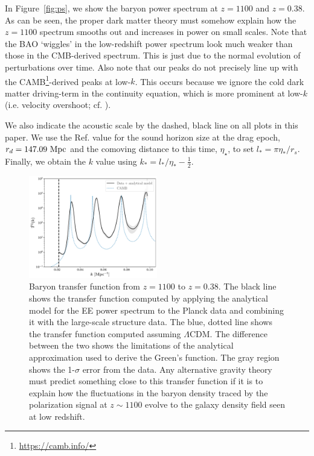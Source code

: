 \documentclass[floats,floatfix,showpacs,amssymb,amsmath,prl,twocolumn,superscriptaddress,nofootinbib, aps]{revtex4-2}
\begin{document}
In Figure~\ref{fig:ps}, we show the baryon power spectrum at $z=1100$ and $z=0.38$. As can be seen, the proper dark matter theory must somehow explain how the $z=1100$ spectrum smooths out and increases in power on small scales. Note that the BAO `wiggles' in the low-redshift power spectrum look much weaker than those in the CMB-derived spectrum. This is just due to the normal evolution of perturbations over time. Also note that our peaks do not precisely line up with the CAMB\footnote{\url{https://camb.info/}}-derived peaks at low-$k$. This occurs because we ignore the cold dark matter driving-term in the continuity equation, which is more prominent at low-$k$ (i.e. velocity overshoot; cf. \citep{Sunyaev1970b, Press1980, Hu1995}). 


We also indicate the acoustic scale by the dashed, black line on all plots in this paper. We use the Ref. \cite{Planck2018} value for the sound horizon size at the drag epoch, $r_d = 147.09~\rm{Mpc}$ and the comoving distance to this time, $\eta_{\star}$, to set $l_* = \pi \eta_*/r_s$. Finally, we obtain the $k$ value using $k_* = l_*/\eta_* - \frac{1}{2}$. 


\begin{figure}[!htb]
    \centering
    \includegraphics[width=0.5\textwidth]{transfer.pdf}
    \caption{Baryon transfer function from $z=1100$ to $z=0.38$. The black line shows the transfer function computed by applying the analytical model for the EE power spectrum to the Planck data and combining it with the large-scale structure data. The blue, dotted line shows the transfer function computed assuming $\Lambda$CDM.  The difference between the two shows the limitations of the analytical approximation used to derive the Green's function. The gray region shows the 1-$\sigma$ error from the data. Any alternative gravity theory must predict something close to this transfer function if it is to explain how the fluctuations in the baryon density traced by the polarization signal at $z \sim 1100$ evolve to the galaxy density field seen at low redshift.}
    \label{fig:transfer}
\end{figure}
\end{document}
